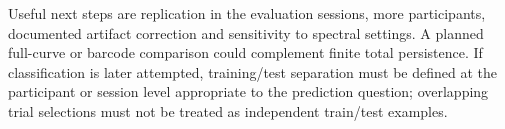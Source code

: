 Useful next steps are replication in the evaluation sessions, more participants, documented artifact correction and sensitivity to spectral settings. A planned full-curve or barcode comparison could complement finite total persistence. If classification is later attempted, training/test separation must be defined at the participant or session level appropriate to the prediction question; overlapping trial selections must not be treated as independent train/test examples.
